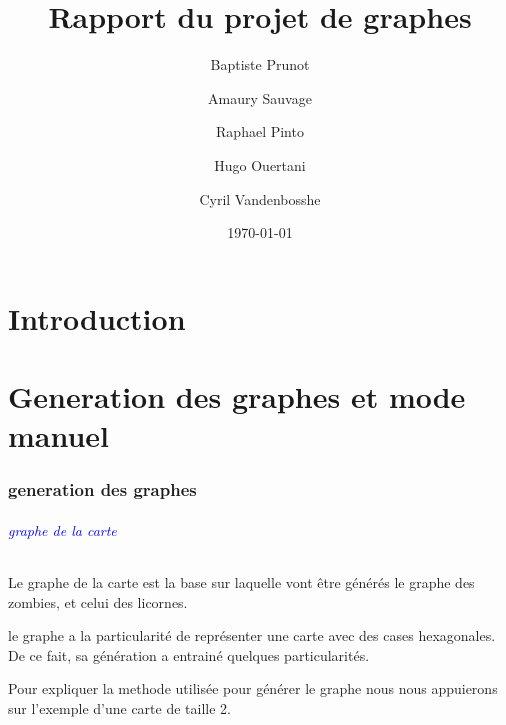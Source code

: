 \documentclass{report}
\title{Rapport du projet de graphes}
\author{Baptiste Prunot
\and Amaury Sauvage
\and Raphael Pinto
\and Hugo Ouertani
\and Cyril Vandenbosshe}
\date{\today}
\begin{document}
	\maketitle

	\part*{Introduction} 
	
	\part{Generation des graphes et mode manuel}
		\section{generation des graphes}
			\paragraph{\textcolor{blue}{graphe de la carte}}
			Le graphe de la carte est la base sur laquelle vont \^etre g\'en\'er\'es le graphe des zombies, et celui des licornes.
			
			le graphe a la particularit\'e de repr\'esenter une carte avec des cases hexagonales. De ce fait, sa g\'en\'eration a entrain\'e quelques particularit\'es.
			
			Pour expliquer la methode utilis\'ee pour g\'en\'erer le graphe nous nous appuierons sur l'exemple d'une carte de taille 2.
			
\end{document}
